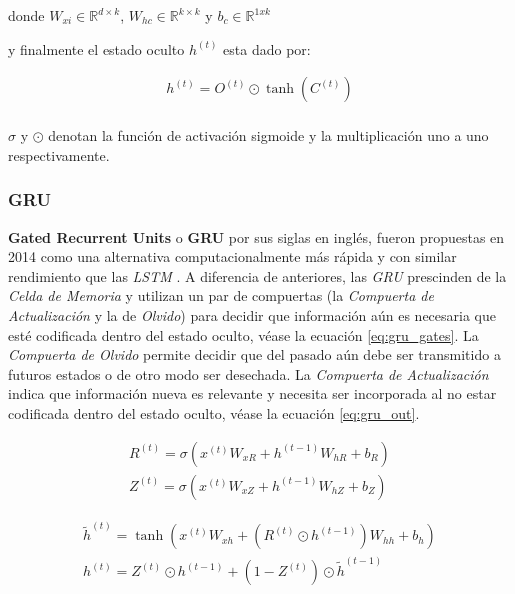 \noindent donde $W_{xi} \in \mathbb{R}^{d \times k}$,
$W_{hc} \in \mathbb{R}^{k \times k}$ y $b_c \in \mathbb{R}^{1xk}$

\noindent y finalmente el estado oculto $h^{(t)}$ esta dado por:

\begin{equation}
    \begin{split}
        h^{(t)} =  O^{(t)} \odot \tanh(C^{(t)}) \\
    \end{split}
\end{equation}

\noindent $\sigma$ y $\odot$ denotan la función de activación sigmoide y la multiplicación uno a uno
respectivamente.


\subsubsection{GRU}

\textbf{Gated Recurrent Units} o \textbf{GRU} por sus siglas en inglés, fueron propuestas en 2014
\cite{GRU1} como una alternativa computacionalmente más rápida y con similar rendimiento que las
\textit{LSTM} \cite{GRU2}. A diferencia de anteriores, las \textit{GRU} prescinden de la
\textit{Celda de Memoria} y utilizan un par de compuertas (la \textit{Compuerta de Actualización} y
la de \textit{Olvido}) para decidir que información aún es necesaria que esté codificada dentro del
estado oculto, véase la ecuación \ref{eq:gru_gates}.
La \textit{Compuerta de Olvido} permite decidir que del pasado aún debe ser transmitido a futuros
estados o de otro modo ser desechada. La \textit{Compuerta de Actualización} indica que información nueva es relevante y
necesita ser incorporada al no estar codificada dentro del estado oculto,
véase la ecuación \ref{eq:gru_out}.

\begin{equation}
    \begin{split}
        R^{(t)} = \sigma(x^{(t)} W_{xR} + h^{(t-1)} W_{hR} + b_R)\\
        Z^{(t)} = \sigma(x^{(t)} W_{xZ} + h^{(t-1)} W_{hZ} + b_Z)
    \end{split}
    \label{eq:gru_gates}
\end{equation}

\begin{equation}
    \begin{split}
        \tilde h^{(t)} = \tanh(x^{(t)} W_{xh} + ( R^{(t)} \odot h^{(t-1)}) W_{hh} + b_h)\\
        h^{(t)} =  Z^{(t)} \odot h^{(t-1)} + (1 - Z^{(t)}) \odot \tilde h^{(t-1)} \\
    \end{split}
    \label{eq:gru_out}
\end{equation}

